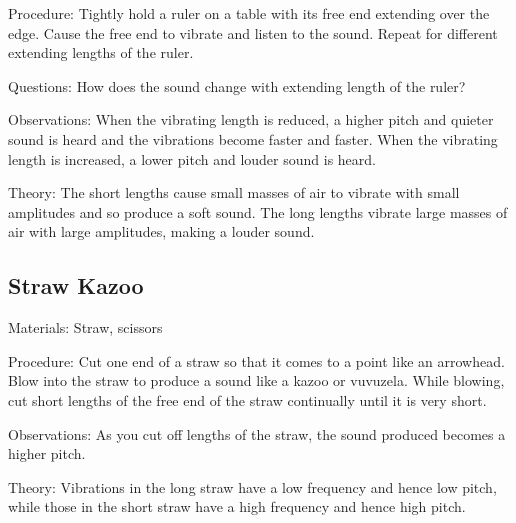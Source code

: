 \begin{multicols}{2}
\begin{description*}
\item[Procedure:]{Tightly hold a ruler on a table with its free end extending over the edge. Cause the free end to vibrate and listen to the sound. Repeat for different extending lengths of the ruler.}
\item[Questions:]{How does the sound change with extending length of the ruler?}
\item[Observations:]{When the vibrating length is reduced, a higher pitch and quieter sound is heard and the vibrations become faster and faster. When the vibrating length is increased, a lower pitch and louder sound is heard.}
\item[Theory:]{The short lengths cause small masses of air to vibrate with small amplitudes and so produce a soft sound. The long lengths vibrate large masses of air with large amplitudes, making a louder sound.}
\end{description*}

\subsection{Straw Kazoo}


\begin{description*}
\item[Materials:]{Straw, scissors}
\item[Procedure:]{Cut one end of a straw so that it comes to a point like an arrowhead. Blow into the straw to produce a sound like a kazoo or vuvuzela. While blowing, cut short lengths of the free end of the straw continually until it is very short.}
\item[Observations:]{As you cut off lengths of the straw, the sound produced becomes a higher pitch.}
\item[Theory:]{Vibrations in the long straw have a low frequency and hence low pitch, while those in the short straw have a high frequency and hence high pitch.}
\end{description*}


\end{multicols}
